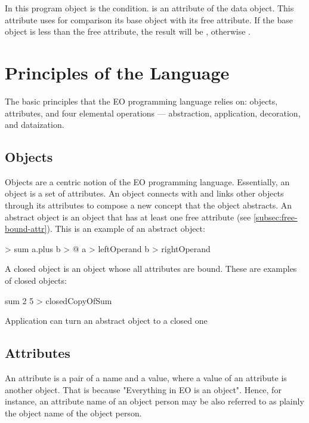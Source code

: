 \documentclass[12pt]{book}
\begin{document}
In this program object  is the condition.  is an attribute of the  data object. This attribute uses for comparison its base object with its free attribute. If the base object is less than the free attribute, the result will be , otherwise . 


\chapter{Principles of the Language}
The basic principles that the EO programming language relies on: objects, attributes, and four elemental operations — abstraction, application, decoration, and dataization. 

\section{Objects} \label{sec:objects}
Objects are a centric notion of the EO programming language. Essentially, an object is a set of attributes. An object connects with and links other objects through its attributes to compose a new concept that the object abstracts.
An abstract object is an object that has at least one free attribute (see \ref{subsec:free-bound-attr}).
This is an example of an abstract object:

\begin{ffcode}
[a b] > sum
  a.plus b > @
  a > leftOperand
  b > rightOperand
\end{ffcode}
A closed object is an object whose all attributes are bound.
These are examples of closed objects:

\begin{ffcode}
sum 2 5 > closedCopyOfSum
\end{ffcode}
Application can turn an abstract object to a closed one


\section{Attributes}
An attribute is a pair of a name and a value, where a value of an attribute is another object. That is because "Everything in EO is an object". Hence, for instance, an attribute name of an object person may be also referred to as plainly the object name of the object person.
\end{document}
